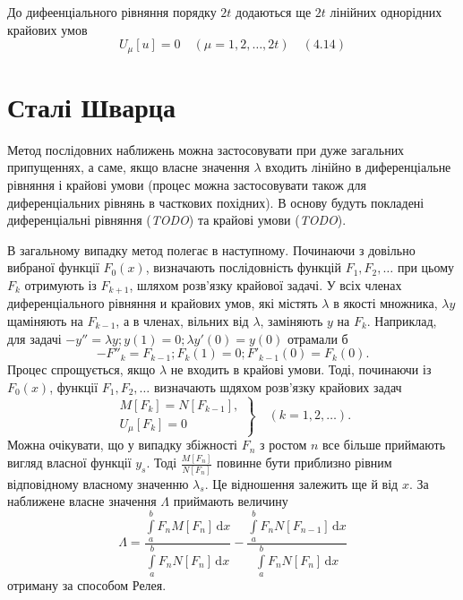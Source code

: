 \documentclass[12pt,a4paper]{article}
\begin{document}
До дифеенціального рівняння порядку $2t$ додаються ще $2t$ лінійних однорідних крайових умов
\[
U_\mu [u] = 0 \quad (\mu = 1, 2, \dots, 2t)   \quad (4.14)
\]

\clearpage

\section{Сталі Шварца}
Метод послідовних наближень можна застосовувати при дуже загальних припущеннях, а саме, якщо власне значення $\lambda$ входить лінійно в диференціальне рівняння і крайові умови (процес можна застосовувати також для диференціальних рівнянь в часткових похідних). В основу будуть покладені диференціальні рівняння (\emph{TODO}) та крайові умови (\emph{TODO}).

В загальному випадку метод полегає в наступному. Починаючи з довільно вибраної функції $F_0(x)$, визначають послідовність функцій $F_1, F_2, \dots$ при цьому $F_k$ отримують із $F_{k+1}$, шляхом розв'язку крайової задачі. У всіх членах диференціального рівняння и крайових умов, які містять $\lambda$ в якості множника, $\lambda y$ щаміняють на $F_{k-1}$, а в членах, вільних від $\lambda$, заміняють $y$ на $F_k$. Наприклад, для задачі $- y'' = \lambda y; y(1) = 0; \lambda y'(0) = y(0)$ отрамали б
\[
	- F''_k = F_{k-1}; F_k(1) = 0; F'_{k-1}(0) = F_k(0).
\] 
Процес спрощується, якщо $\lambda$ не входить в крайові умови. Тоді, починаючи із $F_0(x)$, функції $F_1, F_2, \dots$ визначають шдяхом розв'язку крайових задач
\[
\left.
\begin{array}{l}
	M[F_k] = N[F_{k-1}],\\
	U_\mu[F_k] = 0
\end{array} \right\}
\quad
(k = 1, 2, \dots).
\]
Можна очікувати, що у випадку збіжності $F_n$ з ростом $n$ все більше приймають вигляд власної функції $y_s$. Тоді $\frac{M[F_n]}{N[F_n]}$ повинне бути приблизно рівним відповідному власному значенню $\lambda_s$. Це відношення залежить ще й від $x$. За наближене власне значення $\Lambda$ приймають величину
\[
\Lambda = \frac{\int\limits_a^b F_n M[F_n]\,\mathrm{d}x}
			   {\int\limits_a^b F_n N[F_n]\,\mathrm{d}x}
		  -
		  \frac{\int\limits_a^b F_n N[F_{n-1}]\,\mathrm{d}x}
			   {\int\limits_a^b F_n N[F_n]\,\mathrm{d}x}
\]
отриману за способом Релея.
\end{document}
